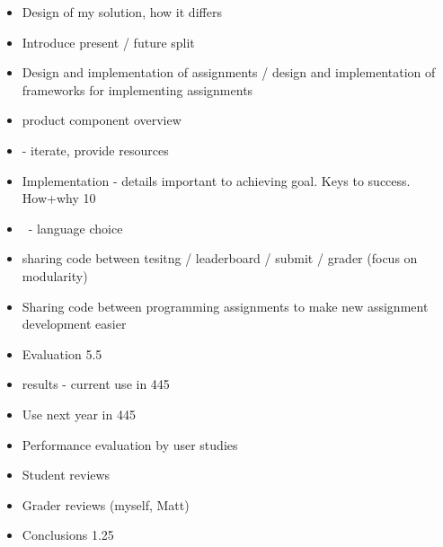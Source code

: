 \documentclass[]{article}
\providecommand{\tightlist}{%
  \setlength{\itemsep}{0pt}\setlength{\parskip}{0pt}}
\begin{document}
\begin{itemize}
\tightlist
\item
  {Design of my solution, how it differs}
\item
  {Introduce present / future split}
\item
  {Design and implementation of assignments / design and implementation
  of frameworks for implementing assignments}
\item
  {product component overview}
\item
  {- iterate, provide resources}
\end{itemize}

\begin{itemize}
\tightlist
\item
  {Implementation - details important to achieving goal. Keys to
  success. How+why 10}
\end{itemize}

\begin{itemize}
\tightlist
\item
  {~- language choice}
\item
  {sharing code between tesitng / leaderboard / submit / grader (focus
  on modularity)}
\item
  {Sharing code between programming assignments to make new assignment
  development easier}
\end{itemize}

\begin{itemize}
\tightlist
\item
  {Evaluation 5.5}
\end{itemize}

\begin{itemize}
\tightlist
\item
  {results - current use in 445}
\item
  {Use next year in 445}
\item
  {Performance evaluation by user studies}
\end{itemize}

\begin{itemize}
\tightlist
\item
  {Student reviews}
\item
  {Grader reviews (myself, Matt)}
\end{itemize}

\begin{itemize}
\tightlist
\item
  {Conclusions 1.25}
\end{itemize}
\end{document}
